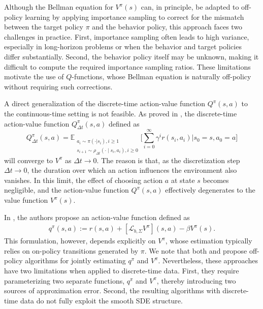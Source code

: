 \documentclass[12pt]{article}
\def\E{\mathbb E}
\def\mL{\mathcal{L}_{b,\Sigma}}
\begin{document}
Although the Bellman equation for $V^\pi(s)$ can, in principle, be adapted to off-policy learning by applying importance sampling to correct for the mismatch between the target policy $\pi$ and the behavior policy, this approach faces two challenges in practice. First, importance sampling often leads to high variance, especially in long-horizon problems or when the behavior and target policies differ substantially. Second, the behavior policy itself may be unknown, making it difficult to compute the required importance sampling ratios. These limitations motivate the use of $Q$-functions, whose Bellman equation is naturally off-policy without requiring such corrections.

A direct generalization of the discrete-time action-value function $Q^\pi(s,a)$ to the continuous-time setting is not feasible. As proved in \citep{jia2023q,tallec2019making}, the discrete-time action-value function $Q_{\Delta t}^\pi(s,a)$ defined as
\begin{equation}\label{def:q-dt}
Q_{\Delta t}^\pi(s,a) = 
\E_{\substack{
a_i \sim \pi(\cdot|s_i), i\geq1\\
s_{i+1} \sim \rho_{\Delta t}(\cdot \mid s_i, a_i), i\geq 0
}} \Big[\sum_{i = 0}^\infty\gamma^ir(s_i,a_i)|s_0 = s, a_0 = a \Big]    
\end{equation}
will converge to $V^\pi$ as $\Delta t \to 0$. The reason is that, as the discretization step $\Delta t \to 0$, the duration over which an action influences the environment also vanishes. In this limit, the effect of choosing action $a$ at state $s$ becomes negligible, and the action-value function $Q^\pi(s,a)$ effectively degenerates to the value function $V^\pi(s)$. 

In \citep{jia2023q, tallec2019making}, the authors propose an action-value function defined as
\begin{align*}
    q^\pi(s,a) := r(s,a) + [\mL V^\pi](s,a) - \beta V^\pi(s).
\end{align*}
This formulation, however, depends explicitly on $V^\pi$, whose estimation typically relies on on-policy transitions generated by $\pi$. We note that both \citet{jia2023q} and \citet{tallec2019making} propose off-policy algorithms for jointly estimating $q^\pi$ and $V^\pi$. Nevertheless, these approaches have two limitations when applied to discrete-time data. First, they require parameterizing two separate functions, $q^\pi$ and $V^\pi$, thereby introducing two sources of approximation error. Second, the resulting algorithms with discrete-time data do not fully exploit the smooth SDE structure. 
\end{document}
